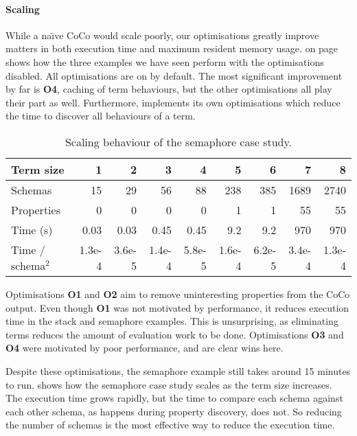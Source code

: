\paragraph{Scaling}
While a na\"{\i}ve CoCo would scale poorly, our optimisations greatly
improve matters in both execution time and maximum resident memory
usage.   on page \pageref{tbl:coco_scale} shows
how the three examples we have seen perform with the optimisations
disabled.  All optimisations are on by default.  The most significant
improvement by far is \textbf{O4}, caching of term behaviours, but the
other optimisations all play their part as well.  Furthermore,
\dejafu{} implements its own optimisations which reduce the time to
discover all behaviours of a term.

\begin{table}[t]
\centering
\begin{tabular}{lrrrrrrrr} \toprule
  Term size           &  1     &   2    &   3    &   4    &     5   &     6   &      7 &      8 \\ \midrule
  Schemas             & 15     &  29    &  56    &  88    &   238   &   385   &   1689 &   2740 \\
  Properties          &  0     &   0    &   0    &   0    &     1   &     1   &     55 &     55 \\
  Time (s)            &  0.03  &   0.03 &   0.45 &   0.45 &     9.2 &     9.2 &    970 &    970 \\ \midrule
  Time / schema$^{2}$ & 1.3e-4 & 3.6e-5 & 1.4e-4 & 5.8e-5 & 1.6e-4  & 6.2e-5  & 3.4e-4 & 1.3e-4 \\ \bottomrule
\end{tabular}
\caption{Scaling behaviour of the semaphore case study.}
\label{tbl:coco-scaling}
\end{table}

Optimisations \textbf{O1} and \textbf{O2} aim to remove uninteresting
properties from the CoCo output.  Even though \textbf{O1} was not
motivated by performance, it reduces execution time in the stack and
semaphore examples.  This is unsurprising, as eliminating terms
reduces the amount of evaluation work to be done.  Optimisations
\textbf{O3} and \textbf{O4} were motivated by poor performance, and
are clear wins here.

Despite these optimisations, the semaphore example still takes around
15 minutes to run.   shows how the semaphore
case study scales as the term size increases.  The execution time
grows rapidly, but the time to compare each schema against each other
schema, as happens during property discovery, does not.  So reducing
the number of schemas is the most effective way to reduce the
execution time.

